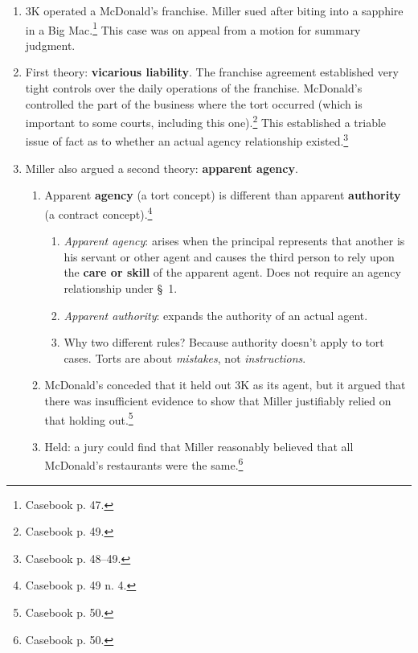 \begin{enumerate}
    \item 3K operated a McDonald's franchise. Miller sued after biting into a 
    sapphire in a Big Mac.\footnote{Casebook p. 47.} This case was on appeal 
    from a motion for summary judgment.
    \item First theory: \textbf{vicarious liability}. The franchise agreement 
    established very tight controls over the daily operations of the 
    franchise. McDonald's controlled the part of the business where the tort 
    occurred (which is important to some courts, including this 
    one).\footnote{Casebook p. 49.} This established a triable issue of fact 
    as to whether an actual agency relationship existed.\footnote{Casebook p.  
    48--49.}
    \item Miller also argued a second theory: \textbf{apparent agency}.
    \begin{enumerate}
        \item Apparent \textbf{agency} (a tort concept) is different than 
        apparent \textbf{authority} (a contract concept).\footnote{Casebook p. 
        49 n. 4.}
        \begin{enumerate}
            \item \emph{Apparent agency}: arises when the principal represents 
            that another is his servant or other agent and causes the third 
            person to rely upon the \textbf{care or skill} of the apparent 
            agent. Does not require an agency relationship under \S\ 1.
            \item \emph{Apparent authority}: expands the authority of an 
            actual agent.
            \item Why two different rules? Because authority doesn't apply to 
            tort cases. Torts are about \emph{mistakes}, not 
            \emph{instructions}.
        \end{enumerate}
        \item McDonald's conceded that it held out 3K as its agent, but it 
        argued that there was insufficient evidence to show that Miller 
        justifiably relied on that holding out.\footnote{Casebook p. 50.}
        \item Held: a jury could find that Miller reasonably believed that all 
        McDonald's restaurants were the same.\footnote{Casebook p. 50.}
    \end{enumerate}
\end{enumerate}


